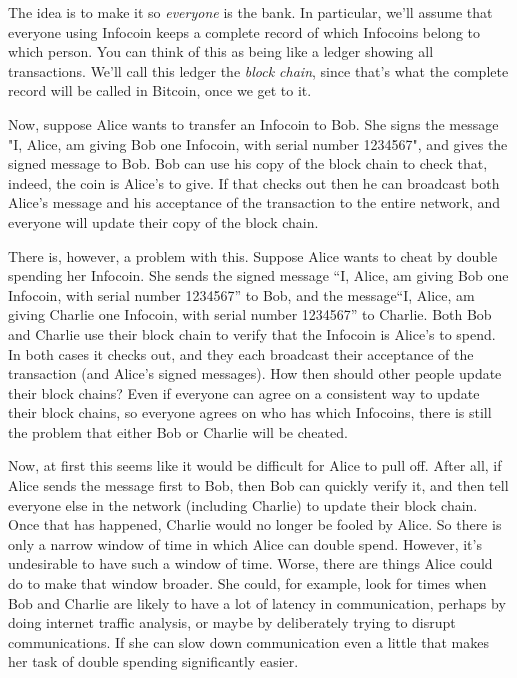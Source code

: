 \documentclass[12pt]{book}
\newcounter{problem}[chapter]
\newcounter{example}[chapter]
\begin{document}
The idea is to make it so \emph{everyone} is the bank.  In particular,
we'll assume that everyone using Infocoin keeps a complete record of
which Infocoins belong to which person.  You can think of this as
being like a ledger showing all transactions.  We'll call this ledger
the \emph{block chain}, since that's what the complete record will be
called in Bitcoin, once we get to it.

Now, suppose Alice wants to transfer an Infocoin to Bob.  She signs
the message "I, Alice, am giving Bob one Infocoin, with serial number
1234567", and gives the signed message to Bob.  Bob can use his copy
of the block chain to check that, indeed, the coin is Alice's to give.
If that checks out then he can broadcast both Alice's message and his
acceptance of the transaction to the entire network, and everyone will
update their copy of the block chain.

There is, however, a problem with this.  Suppose Alice wants to cheat
by double spending her Infocoin.  She sends the signed message ``I,
Alice, am giving Bob one Infocoin, with serial number 1234567'' to
Bob, and the message``I, Alice, am giving Charlie one Infocoin, with
serial number 1234567'' to Charlie.  Both Bob and Charlie use their
block chain to verify that the Infocoin is Alice's to spend.  In both
cases it checks out, and they each broadcast their acceptance of the
transaction (and Alice's signed messages).  How then should other
people update their block chains?  Even if everyone can agree on a
consistent way to update their block chains, so everyone agrees on who
has which Infocoins, there is still the problem that either Bob or
Charlie will be cheated.

Now, at first this seems like it would be difficult for Alice to pull
off.  After all, if Alice sends the message first to Bob, then Bob can
quickly verify it, and then tell everyone else in the network
(including Charlie) to update their block chain.  Once that has
happened, Charlie would no longer be fooled by Alice. So there is only
a narrow window of time in which Alice can double spend.  However,
it's undesirable to have such a window of time.  Worse, there are
things Alice could do to make that window broader.  She could, for
example, look for times when Bob and Charlie are likely to have a lot
of latency in communication, perhaps by doing internet traffic
analysis, or maybe by deliberately trying to disrupt communications.
If she can slow down communication even a little that makes her task
of double spending significantly easier.
\end{document}
